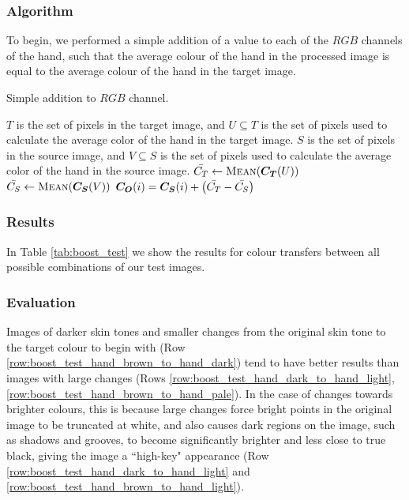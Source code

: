\subsubsection*{Algorithm}
To begin, we performed a simple addition of a value to each of the $RGB$ channels of the hand, such that the average colour of the hand in the processed image is equal to the average colour of the hand in the target image.

\begin{algorithm}[H]
\caption{Simple addition to $RGB$ channel.}
\label{eq:boost_algo}
\begin{algorithmic}
\State $T$ is the set of pixels in the target image, and $U \subseteq T$ is the set of pixels used to calculate the average color of the hand in the target image.
\State $S$ is the set of pixels in the source image, and $V \subseteq S$ is the set of pixels used to calculate the average color of the hand in the source image.
\State $\mean{C_T} \gets \Call{Mean}{\vect{C_T}(U)}$
\State $\mean{C_S} \gets \Call{Mean}{\vect{C_S}(V)}$
\State $\boldsymbol{C_O}(i) = \boldsymbol{C_S}(i) + \left(\bar{C_T} - \bar{C_S}\right)$
\EndFor
\end{algorithmic}
\end{algorithm}


\subsubsection*{Results}
In Table \ref{tab:boost_test} we show the results for colour transfers between all possible combinations of our test images.


\subsubsection*{Evaluation}
Images of darker skin tones and smaller changes from the original skin tone to the target colour to begin with (Row \ref{row:boost_test_hand_brown_to_hand_dark}) tend to have better results than images with large changes (Rows \ref{row:boost_test_hand_dark_to_hand_light}, \ref{row:boost_test_hand_brown_to_hand_pale}). In the case of changes towards brighter colours, this is because large changes force bright points in the original image to be truncated at white, and also causes dark regions on the image, such as shadows and grooves, to become significantly brighter and less close to true black, giving the image a ``high-key" appearance (Row \ref{row:boost_test_hand_dark_to_hand_light} and \ref{row:boost_test_hand_brown_to_hand_light}).


